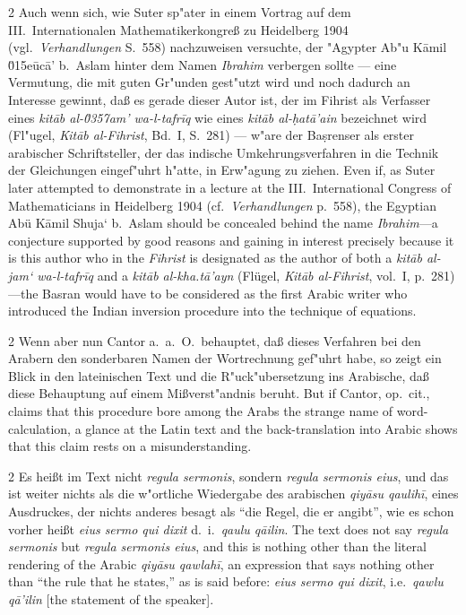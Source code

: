 \documentclass[10pt,a4paper]{article}
\renewcommand{\switchcolumn}{\syncronize\nointerlineskip\columnbreak}
\newcommand{\enquote}[1]{``#1''}
\begin{document}
\begin{paracol}{2}
Auch wenn sich, wie Suter sp"ater in einem Vortrag auf dem III.\ Internationalen Mathematikerkongre\ss{} zu Heidelberg 1904 (vgl.\ \textit{Verhandlungen} S.\ 558) nachzuweisen versuchte, der "Agypter Ab"u K\=amil \u015e\=uc\=a' b.\ Aslam hinter dem Namen \textit{Ibrahim} verbergen sollte --- eine Vermutung, die mit guten Gr"unden gest"utzt wird und noch dadurch an Interesse gewinnt, da\ss{} es gerade dieser Autor ist, der im Fihrist als Verfasser eines \textit{kit\=ab al-\u0357{}am' wa-l-tafr\={i}q} wie eines \textit{kit\=ab al-\d{h}at\=a'ain} bezeichnet wird (Fl"ugel, \textit{Kit\=ab al-Fihrist}, Bd.\ I, S.\ 281) --- w"are der Ba\d{s}renser als erster arabischer Schriftsteller, der das indische Umkehrungsverfahren in die Technik der Gleichungen eingef"uhrt h"atte, in Erw"agung zu ziehen.
\switchcolumn
Even if, as Suter later attempted to demonstrate in a lecture at the III.\ International Congress of Mathematicians in Heidelberg 1904 (cf.\ \textit{Verhandlungen} p.\ 558), the Egyptian Ab\"u K\=amil Shuja` b.\ Aslam should be concealed behind the name \textit{Ibrahim}---a conjecture supported by good reasons and gaining in interest precisely because it is this author who in the \textit{Fihrist} is designated as the author of both a \textit{kit\=ab al-jam` wa-l-tafr\={i}q} and a \textit{kit\=ab al-kha.t\=a'ayn} (Fl\"ugel, \textit{Kit\=ab al-Fihrist}, vol.\ I, p.\ 281)---the Basran would have to be considered as the first Arabic writer who introduced the Indian inversion procedure into the technique of equations.
\end{paracol}

\begin{paracol}{2}
Wenn aber nun Cantor a.\ a.\ O.\ behauptet, da\ss{} dieses Verfahren bei den Arabern den sonderbaren Namen der Wortrechnung gef"uhrt habe, so zeigt ein Blick in den lateinischen Text und die R"uck"ubersetzung ins Arabische, da\ss{} diese Behauptung auf einem Mi\ss{}verst"andnis beruht.
\switchcolumn
But if Cantor, op.\ cit., claims that this procedure bore among the Arabs the strange name of word-calculation, a glance at the Latin text and the back-translation into Arabic shows that this claim rests on a misunderstanding.
\end{paracol}

\begin{paracol}{2}
Es hei\ss{}t im Text nicht \textit{regula sermonis}, sondern \textit{regula sermonis eius}, und das ist weiter nichts als die w"ortliche Wiedergabe des arabischen \textit{qiy\=asu qaulih\={i}}, eines Ausdruckes, der nichts anderes besagt als \enquote{die Regel, die er angibt}, wie es schon vorher hei\ss{}t \textit{eius sermo qui dixit} d.\ i.\ \textit{qaulu q\=ailin}.
\switchcolumn
The text does not say \textit{regula sermonis} but \textit{regula sermonis eius}, and this is nothing other than the literal rendering of the Arabic \textit{qiy\=asu qawlah\={i}}, an expression that says nothing other than ``the rule that he states,'' as is said before: \textit{eius sermo qui dixit}, i.e.\ \textit{qawlu q\=a'ilin} [the statement of the speaker].
\end{paracol}
\end{document}
